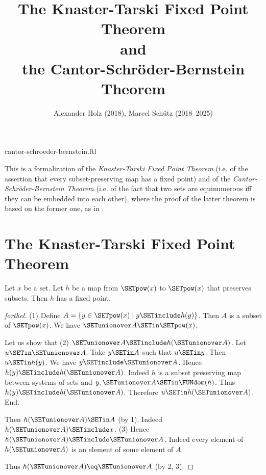 \documentclass{article}
\title{The Knaster-Tarski Fixed Point Theorem\\and\\the Cantor-Schröder-Bernstein Theorem}
\author{Alexander Holz (2018), Marcel Schütz (2018--2025)}
\date{}
\begin{document}
\begin{smodule}{cantor-schroeder-bernstein.ftl}
\maketitle


\noindent This is a formalization of the \textit{Knaster-Tarski Fixed Point
Theorem} (i.e. of the assertion that every subset-preserving map has a fixed
point) and of the \textit{Cantor-Schröder-Bernstein Theorem} (i.e. of the
fact that two sets are equinumerous iff they can be embedded into each other),
where the proof of the latter theorem is based on the former one, as in
\cite{Schroeder2012}.

\section*{The Knaster-Tarski Fixed Point Theorem}

\begin{theorem}[forthel,title=Knaster-Tarski,id=knaster_tarski]
  Let $x$ be a set.
  Let $h$ be a map from $\SETpow(x)$ to $\SETpow(x)$ that preserves subsets.
  Then $h$ has a fixed point.
\end{theorem}
\begin{proof}[forthel]
  (1) Define $A = \{y \in \SETpow(x) \mid y \SETinclude h(y)\}$.
  Then $A$ is a subset of $\SETpow(x)$.
  We have $\SETunionover A \SETin \SETpow(x)$.

  Let us show that (2) $\SETunionover A \SETinclude h(\SETunionover A)$.
    Let $u \SETin \SETunionover A$.
    Take $y \SETin A$ such that $u \SETin y$.
    Then $u \SETin h(y)$.
    We have $y \SETinclude \SETunionover A$.
    Hence $h(y) \SETinclude h(\SETunionover A)$.
    Indeed $h$ is a subset preserving map between systems of sets and $y, \SETunionover A \SETin \FUNdom(h)$.
    Thus $h(y) \SETinclude h(\SETunionover A)$.
    Therefore $u \SETin h(\SETunionover A)$.
  End.

  Then $h(\SETunionover A) \SETin A$ (by 1).
  Indeed $h(\SETunionover A) \SETinclude x$.
  (3) Hence $h(\SETunionover A) \SETinclude \SETunionover A$.
  Indeed every element of $h(\SETunionover A)$ is an element of some element of
  $A$.

  Thus $h(\SETunionover A) \eq \SETunionover A$ (by 2, 3).
\end{proof}



\end{smodule}
\end{document}
